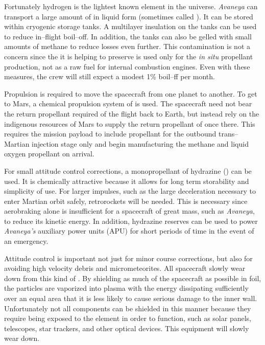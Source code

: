 Fortunately hydrogen is the lightest known element in the universe. {\it Avaneya} can transport a large amount of  in liquid form (sometimes called ). It can be stored within cryogenic storage tanks. A multilayer insulation on the tanks can be used to reduce in--flight boil--off. In addition, the tanks can also be gelled with small amounts of methane to reduce losses even further. This  contamination is not a concern since the  it is helping to preserve is used only for the {\it in situ} propellant production, not as a raw fuel for internal combustion engines. Even with these measures, the crew will still expect a modest 1\% boil--ff per month.

Propulsion is required to move the spacecraft from one planet to another. To get to Mars, a chemical propulsion system of  is used. The spacecraft need not bear the return propellant required of the flight back to Earth, but instead rely on the indigenous resources of Mars to supply the return propellant of  once there. This requires the mission payload to include propellant for the outbound trans--Martian injection stage only and begin manufacturing the methane and liquid oxygen propellant on arrival. 

For small attitude control corrections, a monopropellant of hydrazine () can be used. It is chemically attractive because it allows for long term storability and simplicity of use. For larger impulses, such as the large deceleration necessary to enter Martian orbit safely, retrorockets will be needed. This is necessary since aerobraking alone is insufficient for a spacecraft of great mass, such as {\it Avaneya}, to reduce its kinetic energy. In addition, hydrazine reserves can be used to power {\it Avaneya's} auxiliary power units (APU) for short periods of time in the event of an emergency.

Attitude control is important not just for minor course corrections, but also for avoiding high velocity debris and micrometeorites. All spacecraft slowly wear down from this kind of . By shielding as much of the spacecraft as possible in foil, the particles are vaporized into plasma with the energy dissipating sufficiently over an equal area that it is less likely to cause serious damage to the inner wall. Unfortunately not all components can be shielded in this manner because they require being exposed to the element in order to function, such as solar panels, telescopes, star trackers, and other optical devices. This equipment will slowly wear down.

